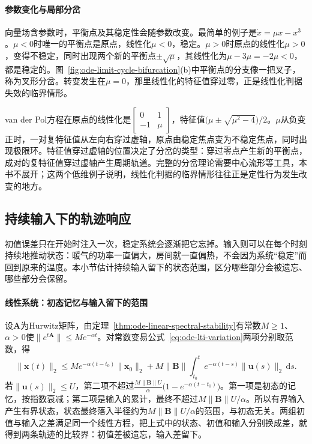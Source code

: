 \paragraph{参数变化与局部分岔}
向量场含参数时，平衡点及其稳定性会随参数改变。最简单的例子是$\dot x=\mu x-x^3$。$\mu<0$时唯一的平衡点是原点，线性化$\mu<0$，稳定。$\mu>0$时原点的线性化$\mu>0$，变得不稳定，同时出现两个新的平衡点$\pm\sqrt\mu$，其线性化为$\mu-3\mu=-2\mu<0$，都是稳定的。图~\ref{fig:ode-limit-cycle-bifurcation}(b)中平衡点的分支像一把叉子，称为叉形分岔。转变发生在$\mu=0$，那里线性化的特征值穿过零，正是线性化判据失效的临界情形。

van der Pol方程在原点的线性化是$\begin{bmatrix}0&1\\-1&\mu\end{bmatrix}$，特征值$\bigl(\mu\pm\sqrt{\mu^2-4}\bigr)/2$。$\mu$从负变正时，一对复特征值从左向右穿过虚轴，原点由稳定焦点变为不稳定焦点，同时出现极限环。特征值穿过虚轴的位置决定了分岔的类型：穿过零点产生新的平衡点，成对的复特征值穿过虚轴产生周期轨道。完整的分岔理论需要中心流形等工具，本书不展开；这两个低维例子说明，线性化判据的临界情形往往正是定性行为发生改变的地方。

\subsection{持续输入下的轨迹响应}
\label{sec:ode-input-response}

初值误差只在开始时注入一次，稳定系统会逐渐把它忘掉。输入则可以在每个时刻持续地推动状态：暖气的功率一直偏大，房间就一直偏热，不会因为系统“稳定”而回到原来的温度。本小节估计持续输入留下的状态范围，区分哪些部分会被遗忘、哪些部分会保留。

\paragraph{线性系统：初态记忆与输入留下的范围}
设$\bm A$为Hurwitz矩阵，由定理~\ref{thm:ode-linear-spectral-stability}有常数$M\geq1$、$\alpha>0$使$\|e^{t\bm A}\|\leq Me^{-\alpha t}$。对常数变易公式~\eqref{eq:ode-lti-variation}两项分别取范数，得
\begin{equation}
  \|\bm x(t)\|_2\leq Me^{-\alpha(t-t_0)}\|\bm x_0\|_2+M\|\bm B\|\int_{t_0}^te^{-\alpha(t-s)}\|\bm u(s)\|_2\,\mathrm ds.
  \label{eq:ode-linear-input-bound}
\end{equation}
若$\|\bm u(s)\|_2\leq U$，第二项不超过$\frac{M\|\bm B\|U}{\alpha}\bigl(1-e^{-\alpha(t-t_0)}\bigr)$。第一项是初态的记忆，按指数衰减；第二项是输入的累计，最终不超过$M\|\bm B\|U/\alpha$。所以有界输入产生有界状态，状态最终落入半径约为$M\|\bm B\|U/\alpha$的范围，与初态无关。两组初值与输入之差满足同一个线性方程，把上式中的状态、初值和输入分别换成差，就得到两条轨迹的比较界：初值差被遗忘，输入差留下。

